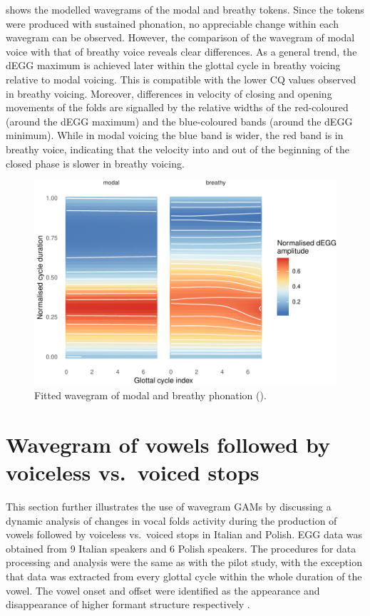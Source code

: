 \documentclass[12pt,a4paper,]{article}
\begin{document}
 shows the modelled wavegrams of the modal and breathy
tokens. Since the tokens were produced with sustained phonation, no
appreciable change within each wavegram can be observed. However, the
comparison of the wavegram of modal voice with that of breathy voice
reveals clear differences. As a general trend, the dEGG maximum is
achieved later within the glottal cycle in breathy voicing relative to
modal voicing. This is compatible with the lower CQ values observed in
breathy voicing. Moreover, differences in velocity of closing and
opening movements of the folds are signalled by the relative widths of
the red-coloured (around the dEGG maximum) and the blue-coloured bands
(around the dEGG minimum). While in modal voicing the blue band is
wider, the red band is in breathy voice, indicating that the velocity
into and out of the beginning of the closed phase is slower in breathy
voicing.

\begin{figure}
\includegraphics[width=\linewidth]{2019-wavegram_files/figure-latex/surface-p-1} \caption{Fitted wavegram of modal and breathy phonation ().}\label{f:surface-p}
\end{figure}

\hypertarget{wavegram-of-vowels-followed-by-voiceless-vs.-voiced-stops}{%
\section{Wavegram of vowels followed by voiceless vs.~voiced
stops}\label{wavegram-of-vowels-followed-by-voiceless-vs.-voiced-stops}}

\label{s:voicing}

This section further illustrates the use of wavegram GAMs by discussing
a dynamic analysis of changes in vocal folds activity during the
production of vowels followed by voiceless vs.~voiced stops in Italian
and Polish. EGG data was obtained from 9 Italian speakers and 6 Polish
speakers. The procedures for data processing and analysis were the same
as with the pilot study, with the exception that data was extracted from
every glottal cycle within the whole duration of the vowel. The vowel
onset and offset were identified as the appearance and disappearance of
higher formant structure respectively \citep{machac2009}.
\end{document}
